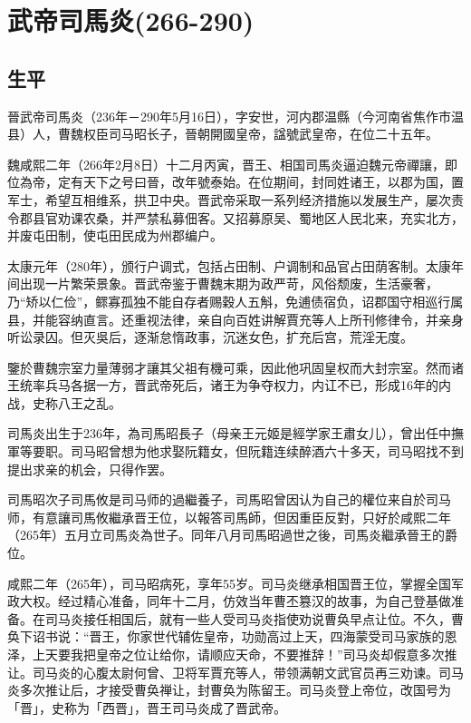 
\section{武帝司馬炎\tiny(266-290)}

\subsection{生平}

晉武帝司馬炎（236年－290年5月16日），字安世，河内郡温縣（今河南省焦作市温县）人，曹魏权臣司马昭长子，晉朝開國皇帝，諡號武皇帝，在位二十五年。

魏咸熙二年（266年2月8日）十二月丙寅，晋王、相国司馬炎逼迫魏元帝禪讓，即位為帝，定有天下之号曰晉，改年號泰始。在位期间，封同姓诸王，以郡为国，置军士，希望互相维系，拱卫中央。晋武帝采取一系列经济措施以发展生产，屡次责令郡县官劝课农桑，并严禁私募佃客。又招募原吴、蜀地区人民北来，充实北方，并废屯田制，使屯田民成为州郡编户。

太康元年（280年），颁行户调式，包括占田制、户调制和品官占田荫客制。太康年间出现一片繁荣景象。晋武帝鉴于曹魏末期为政严苛，风俗颓废，生活豪奢，乃“矫以仁俭”，鳏寡孤独不能自存者赐穀人五斛，免逋债宿负，诏郡国守相巡行属县，并能容纳直言。还重视法律，亲自向百姓讲解賈充等人上所刊修律令，并亲身听讼录囚。但灭吳后，逐渐怠惰政事，沉迷女色，扩充后宫，荒淫无度。

鑒於曹魏宗室力量薄弱才讓其父祖有機可乘，因此他巩固皇权而大封宗室。然而诸王统率兵马各据一方，晋武帝死后，诸王为争夺权力，内讧不已，形成16年的内战，史称八王之乱。

司馬炎出生于236年，為司馬昭長子（母亲王元姬是經学家王肅女儿），曾出任中撫軍等要职。司马昭曾想为他求娶阮籍女，但阮籍连续醉酒六十多天，司马昭找不到提出求亲的机会，只得作罢。

司馬昭次子司馬攸是司马师的過繼養子，司馬昭曾因认为自己的權位来自於司马师，有意讓司馬攸繼承晋王位，以報答司馬師，但因重臣反對，只好於咸熙二年（265年）五月立司馬炎為世子。同年八月司馬昭過世之後，司馬炎繼承晉王的爵位。

咸熙二年（265年），司马昭病死，享年55岁。司马炎继承相国晋王位，掌握全国军政大权。经过精心准备，同年十二月，仿效当年曹丕篡汉的故事，为自己登基做准备。在司马炎接任相国后，就有一些人受司马炎指使劝说曹奂早点让位。不久，曹奂下诏书说：“晋王，你家世代辅佐皇帝，功勋高过上天，四海蒙受司马家族的恩泽，上天要我把皇帝之位让给你，请顺应天命，不要推辞！”司马炎却假意多次推让。司马炎的心腹太尉何曾、卫将军賈充等人，带领满朝文武官员再三劝谏。司马炎多次推让后，才接受曹奂禅让，封曹奂为陈留王。司马炎登上帝位，改国号为「晋」，史称为「西晋」，晋王司马炎成了晋武帝。

